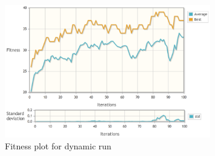 \begin{figure}[H]
  \centering
    \includegraphics[width=0.8\textwidth]{img/Flatland_dynamic}
    \caption{Fitness plot for dynamic run}
\end{figure}

